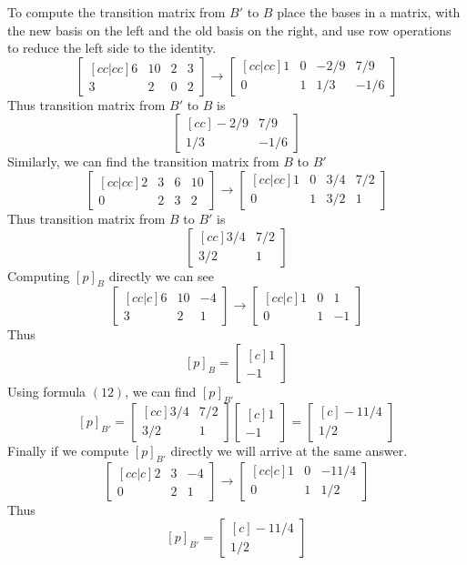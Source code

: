 \begin{solution}
\noindent To compute the transition matrix from $B'$ to $B$ place the bases in a matrix, with the new basis on the left and the old basis on the right, and use row operations to reduce the left side to the identity.
$$
\begin{bmatrix}[cc|cc]
6&10&2&3\\
3&2&0&2
\end{bmatrix}
\rightarrow
\begin{bmatrix}[cc|cc]
1&0&-2/9&7/9\\
0&1&1/3&-1/6
\end{bmatrix}
$$
Thus transition matrix from $B'$ to $B$ is
$$
\begin{bmatrix}[cc]
-2/9&7/9\\
1/3&-1/6
\end{bmatrix}
$$
Similarly, we can find the transition matrix from $B$ to $B'$
$$
\begin{bmatrix}[cc|cc]
2&3&6&10\\
0&2&3&2
\end{bmatrix}
\rightarrow
\begin{bmatrix}[cc|cc]
1&0&3/4&7/2\\
0&1&3/2&1
\end{bmatrix}
$$
Thus transition matrix from $B$ to $B'$ is
$$
\begin{bmatrix}[cc]
3/4&7/2\\
3/2&1
\end{bmatrix}
$$
Computing $[p]_B$ directly we can see
$$
\begin{bmatrix}[cc|c]
6&10&-4\\
3&2&1
\end{bmatrix}
\rightarrow
\begin{bmatrix}[cc|c]
1&0&1\\
0&1&-1
\end{bmatrix}
$$
Thus
$$
[p]_B =
\begin{bmatrix}[c]
1\\
-1
\end{bmatrix}
$$
Using formula $(12)$, we can find $[p]_{B'}$
$$
[p]_{B'} =
\begin{bmatrix}[cc]
3/4&7/2\\
3/2&1
\end{bmatrix}
\begin{bmatrix}[c]
1\\
-1
\end{bmatrix}=
\begin{bmatrix}[c]
-11/4\\
1/2
\end{bmatrix}
$$
Finally if we compute $[p]_{B'}$ directly we will arrive at the same answer.
$$
\begin{bmatrix}[cc|c]
2&3&-4\\
0&2&1
\end{bmatrix}
\rightarrow
\begin{bmatrix}[cc|c]
1&0&-11/4\\
0&1&1/2
\end{bmatrix}
$$
Thus
$$
[p]_{B'} =
\begin{bmatrix}[c]
-11/4\\
1/2
\end{bmatrix}
$$
\end{solution}

